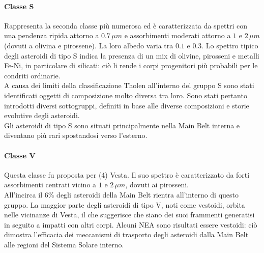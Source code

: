 \documentclass[a4paper,11pt,openright]{book}
\begin{document}
\paragraph*{Classe S}
Rappresenta la seconda classe più numerosa ed è caratterizzata da spettri con una pendenza ripida attorno a $0.7\,\mu m$ e assorbimenti moderati attorno a $1$ e $2\,\mu m$ (dovuti a olivina e pirossene). La loro albedo varia tra $0.1$ e $0.3$. Lo spettro tipico degli asteroidi di tipo S indica la presenza di un mix di olivine, pirosseni e metalli Fe-Ni, in particolare di silicati: ciò li rende i corpi progenitori più probabili per le condriti ordinarie.\\
A causa dei limiti della classificazione Tholen all’interno del gruppo S sono stati identificati oggetti di composizione molto diversa tra loro. Sono stati pertanto introdotti diversi sottogruppi, definiti in base alle diverse composizioni e storie evolutive degli asteroidi.\\
Gli asteroidi di tipo S sono situati principalmente nella Main Belt interna e diventano più rari spostandosi verso l'esterno.

\paragraph*{Classe V}
Questa classe fu proposta per (4) Vesta. Il suo spettro è caratterizzato da forti assorbimenti centrati vicino a $1$ e $2\,\mu m$, dovuti ai pirosseni.\\
All'incirca il 6\% degli asteroidi della Main Belt rientra all'interno di questo gruppo. La maggior parte degli asteroidi di tipo V, noti come vestoidi, orbita nelle vicinanze di Vesta, il che suggerisce che siano dei suoi frammenti generatisi in seguito a impatti con altri corpi. Alcuni NEA sono risultati essere vestoidi: ciò dimostra l'efficacia dei meccanismi di trasporto degli asteroidi dalla Main Belt alle regioni del Sistema Solare interno.
\end{document}
